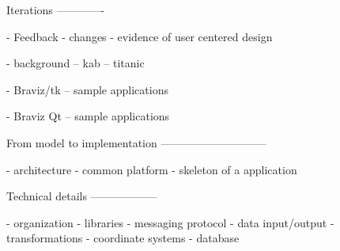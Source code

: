 

Iterations
-------------

- Feedback
- changes
- evidence of user centered design

- background
-- kab
-- titanic

- Braviz/tk
-- sample applications

- Braviz Qt
-- sample applications

From model to implementation
-----------------------------

- architecture
- common platform
- skeleton of a application


Technical details
------------------

- organization
- libraries
- messaging protocol
- data input/output
- transformations
- coordinate systems
- database


